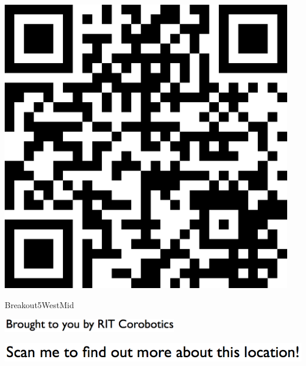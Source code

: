 \documentclass[letterpaper]{article}
\begin{document}
 \begingroup 
 \centerline{\includegraphics[scale=1,width=5in,height=5in]{Breakout5WestMid.png}} 
 \endgroup 
 \vspace*{\fill} 

 \hfill{\small Breakout5WestMid} 

  \vspace{0.7in} 
 
 \centerline{\includegraphics[scale=1,width=3in]{text-bottom.png}} 
 
 \pagebreak 
{} 
 \vspace*{\fill} 
 
  \centerline{\includegraphics[scale=1,width=6in]{text-top.png}} 
 
 \vspace{0.5in} 
 
\end{document}
